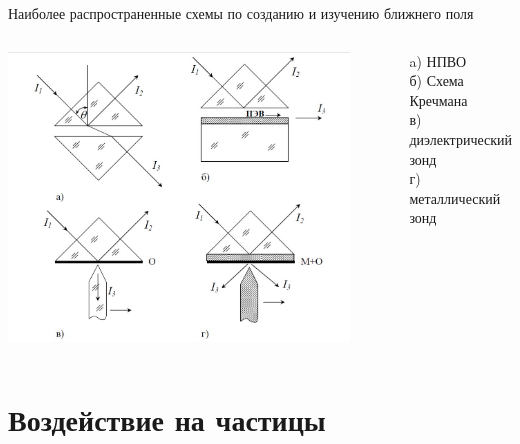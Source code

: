 \documentclass[9pt, compress, xcolor=table]{beamer}
\begin{document}
\begin{frame}{Наиболее распространенные схемы}
по созданию и изучению ближнего поля
\begin{columns}[c]

\column{9.5cm}

\begin{center}
\includegraphics[width=0.9\textwidth]{schemes}
\end{center}

\column{3.5cm}

a) НПВО \\
б) Схема Кречмана \\
в) диэлектрический зонд \\
г) металлический \\ зонд

\end{columns}
\end{frame}
\section{Воздействие на частицы} 
\end{document}
